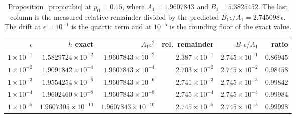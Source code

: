 \documentclass[11pt,reqno]{amsart}
\theoremstyle{plain}
\theoremstyle{definition}
\theoremstyle{remark}
\numberwithin{equation}{section}
\begin{document}
\begin{table}[ht]
\centering\footnotesize\setlength{\tabcolsep}{5pt}
\caption{Proposition~\ref{prop:cubic} at $p_0=0.15$, where $A_1=1.9607843$ and $B_1=5.3825452$. The last column is the measured relative remainder divided by the predicted $B_1\epsilon/A_1=2.745098\,\epsilon$. The drift at $\epsilon=10^{-1}$ is the quartic term and at $10^{-5}$ is the rounding floor of the exact value.}
\label{tab:cubic}
\begin{tabular}{@{}r r r r r r@{}}
\toprule
$\epsilon$ & $h$ exact & $A_1\epsilon^2$ & rel.\ remainder & $B_1\epsilon/A_1$ & ratio\\
\midrule
$1\times10^{-1}$ & $1.5829724 \times 10^{-2}$ & $1.9607843 \times 10^{-2}$ & $2.387 \times 10^{-1}$ & $2.745 \times 10^{-1}$ & $0.86945$\\
$1\times10^{-2}$ & $1.9091842 \times 10^{-4}$ & $1.9607843 \times 10^{-4}$ & $2.703 \times 10^{-2}$ & $2.745 \times 10^{-2}$ & $0.98458$\\
$1\times10^{-3}$ & $1.9554254 \times 10^{-6}$ & $1.9607843 \times 10^{-6}$ & $2.741 \times 10^{-3}$ & $2.745 \times 10^{-3}$ & $0.99842$\\
$1\times10^{-4}$ & $1.9602460 \times 10^{-8}$ & $1.9607843 \times 10^{-8}$ & $2.745 \times 10^{-4}$ & $2.745 \times 10^{-4}$ & $0.99984$\\
$1\times10^{-5}$ & $1.9607305 \times 10^{-10}$ & $1.9607843 \times 10^{-10}$ & $2.745 \times 10^{-5}$ & $2.745 \times 10^{-5}$ & $0.99998$\\
\bottomrule
\end{tabular}
\end{table}
\end{document}
